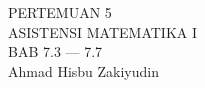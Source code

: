 \documentclass{article}
\begin{document}
 \begin{titlepage}
    \vspace*{\fill}
    \begin{center}
      \Huge {PERTEMUAN 5 \\ASISTENSI MATEMATIKA I\\BAB 7.3 — 7.7}\\[0.4 cm]
      \huge {Ahmad Hisbu Zakiyudin}
    \end{center}
    \vspace*{\fill}
  \end{titlepage}
\makeatletter
\renewcommand*\env@matrix[1][*\c@MaxMatrixCols c]{%
  \hskip -\arraycolsep
  \let\@ifnextchar\new@ifnextchar
  \array{#1}}
\makeatother
\newcount\arrowcount
\newcommand\arrows[1]{
        \global\arrowcount#1
        \ifnum\arrowcount>0
                \begin{matrix}[c]
                \expandafter\nextarrow
        \fi
}
\end{document}
